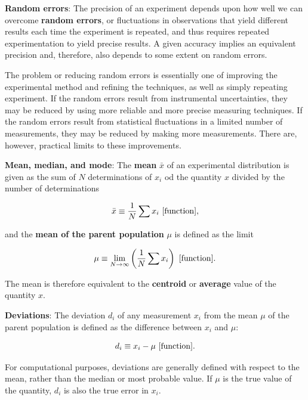 \documentclass[a4paper,10pt]{article}
\begin{document}
{\noindent}\textbf{Random errors}: The precision of an experiment depends upon how well we can overcome \textbf{random errors}, or fluctuations in observations that yield different results each time the experiment is repeated, and thus requires repeated experimentation to yield precise results. A given accuracy implies an equivalent precision and, therefore, also depends to some extent on random errors. 

{\noindent}The problem or reducing random errors is essentially one of improving the experimental method and refining the techniques, as well as simply repeating experiment. If the random errors result from instrumental uncertainties, they may be reduced by using more reliable and more precise measuring techniques. If the random errors result from statistical fluctuations in a limited number of measurements, they may be reduced by making more measurements. There are, however, practical limits to these improvements. 

{\noindent}\textbf{Mean, median, and mode}: The \textbf{mean} $\bar{x}$ of an experimental distribution is given as the sum of $N$ determinations of $x_i$ od the quantity $x$ divided by the number of determinations

\begin{align*}
    \bar{x} \equiv \frac{1}{N} \sum x_i ~ [{\rm function}],
\end{align*}

{\noindent}and the \textbf{mean of the parent population} $\mu$ is defined as the limit

\begin{align*}
    \mu \equiv \lim_{N\rightarrow\infty}\left( \frac{1}{N} \sum x_i \right) ~ [{\rm function}].
\end{align*}

{\noindent}The mean is therefore equivalent to the \textbf{centroid} or \textbf{average} value of the quantity $x$.

{\noindent}\textbf{Deviations}: The deviation $d_i$ of any measurement $x_i$ from the mean $\mu$ of the parent population is defined as the difference between $x_i$ and $\mu$:

\begin{align*}
    d_i \equiv x_i - \mu ~ [{\rm function}].
\end{align*}

{\noindent}For computational purposes, deviations are generally defined with respect to the mean, rather than the median or most probable value. If $\mu$ is the true value of the quantity, $d_i$ is also the true error in $x_i$.
\end{document}
